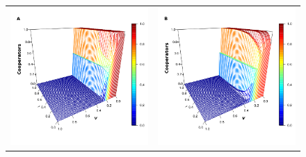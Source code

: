 \documentclass[11pt]{article}
\begin{document}
\begin{figure} [h!]
\centering
\begin{tabular}{cc}
  \includegraphics[scale=0.28]{images/erdos_dc_nus_1.png} & \includegraphics[scale=0.28]{images/watts_dc_nus_1.png}

\end{tabular}
\end{figure}
\end{document}
